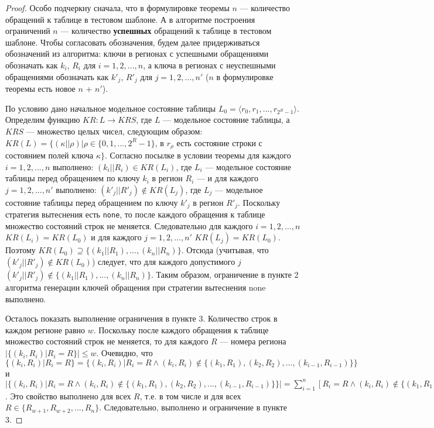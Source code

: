 \theoremtext{\ref{mirror_fullness_none}}{\FullnessMirrorNone}
\begin{proof}
  Особо подчеркну сначала, что в формулировке теоремы $n$ --- количество обращений к таблице в тестовом шаблоне. А в алгоритме построения ограничений $n$ --- количество \textbf{успешных} обращений к таблице в тестовом шаблоне. Чтобы согласовать обозначения, будем далее придерживаться обозначений из алгоритма: ключи в регионах с успешными обращениями обозначать как $k_i$, $R_i$ для $i = 1, 2, ..., n$, а ключа в регионах с неуспешными обращениями обозначать как $k'_j$, $R'_j$ для $j = 1, 2, ..., n'$ ($n$ в формулировке теоремы есть новое $n$ + $n'$).

  По условию дано начальное модельное состояние таблицы $L_0 = \langle r_0, r_1, ..., r_{2^R-1} \rangle$. Определим функцию $KR: L \rightarrow KRS$, где $L$ --- модельное состояние таблицы, а $KRS$ --- множество целых чисел, следующим образом: $KR(L) = \{(\kappa||\rho) | \rho \in \{0, 1, ..., 2^R{-}1\}$, в $r_{\rho}$ есть состояние строки с состоянием полей ключа $\kappa\}$. Согласно посылке в условии теоремы для каждого $i = 1, 2, ..., n$ выполнено: $(k_i || R_i) \in KR(L_i)$, где $L_i$ --- модельное состояние таблицы перед обращением по ключу $k_i$ в регион $R_i$ --- и для каждого $j = 1, 2, ..., n'$ выполнено: $(k'_j || R'_j) \notin KR(L_j)$, где $L_j$ --- модельное состояние таблицы перед обращением по ключу $k'_j$ в регион $R'_j$. Поскольку стратегия вытеснения есть \texttt{none}, то после каждого обращения к таблице множество состояний строк не меняется. Следовательно для каждого $i = 1, 2, ..., n$ $KR(L_i) = KR(L_0)$ и для каждого $j = 1, 2, ..., n'$ $KR(L_j) = KR(L_0)$. Поэтому $KR(L_0) \supseteq \{ (k_1||R_1), ..., (k_n||R_n) \}$. Отсюда (учитывая, что $(k'_j||R'_j) \notin KR(L_0)$) следует, что для каждого допустимого $j$ $(k'_j||R'_j) \notin \{ (k_1||R_1), ..., (k_n||R_n) \}$. Таким образом, ограничение в пункте 2 алгоритма генерации ключей обращения при стратегии вытеснения none выполнено.

  Осталось показать выполнение ограничения в пункте 3. Количество строк в каждом регионе равно $w$. Поскольку после каждого обращения к таблице множество состояний строк не меняется, то для каждого $R$ --- номера региона $|\{(k_i, R_i)|R_i = R\}| \leqslant w$. Очевидно, что $\{(k_i, R_i)|R_i = R\} = \{(k_i, R_i)|R_i = R \wedge (k_i, R_i) \notin \{(k_1, R_1), (k_2, R_2), ..., (k_{i-1}, R_{i-1})\}\}$ и $|\{(k_i, R_i)|R_i = R \wedge (k_i, R_i) \notin \{(k_1, R_1), (k_2, R_2), ..., (k_{i-1}, R_{i-1})\}\}| = \sum_{i=1}^n [R_i = R \wedge (k_i, R_i) \notin \{(k_1, R_1), (k_2, R_2), ..., (k_{i-1}, R_{i-1})\}] = \sum_{i=1}^n [c_R(k_i, R_i)]$. Это свойство выполнено для всех $R$, т.е. в том числе и для всех $R \in \{R_{w+1}, R_{w+2}, ..., R_n\}$. Следовательно, выполнено и ограничение в пункте 3.
\end{proof}

